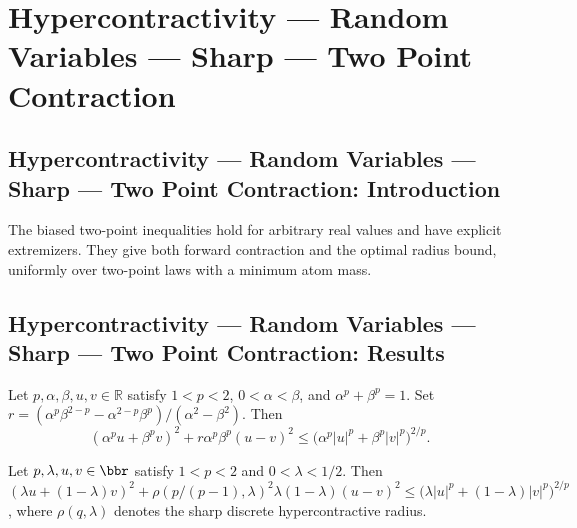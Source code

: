 \section{Hypercontractivity --- Random Variables --- Sharp --- Two Point Contraction}
\subsection*{Hypercontractivity --- Random Variables --- Sharp --- Two Point Contraction: Introduction}
The biased two-point inequalities hold for arbitrary real values and have explicit extremizers. They give both forward contraction and the optimal radius bound, uniformly over two-point laws with a minimum atom mass.

\subsection*{Hypercontractivity --- Random Variables --- Sharp --- Two Point Contraction: Results}

\begin{theorem}
\leanok
{}
Let $p,\alpha,\beta,u,v\in\mathbb{R}$ satisfy $1<p<2$, $0<\alpha<\beta$, and
$\alpha^p+\beta^p=1$. Set
$r=(\alpha^p\beta^{2-p}-\alpha^{2-p}\beta^p)/(\alpha^2-\beta^2)$. Then
\[
(\alpha^p u+\beta^p
v)^2+r\alpha^p\beta^p(u-v)^2\le\bigl(\alpha^p|u|^p+\beta^p|v|^p\bigr)^{2/p}.
\]
\end{theorem}

\begin{theorem}
\leanok
{}
Let $p,\lambda,u,v\in\bbr$ satisfy $1<p<2$ and $0<\lambda<1/2$. Then $(\lambda
u+(1-\lambda)v)^2+\rho(p/(p-1),\lambda)^2\lambda(1-\lambda)(u-v)^2\le\big(\lambda|u|^p+(1-\lambda)|v|^p\big)^{2/p}$,
where $\rho(q,\lambda)$ denotes the sharp discrete hypercontractive radius.
\end{theorem}

